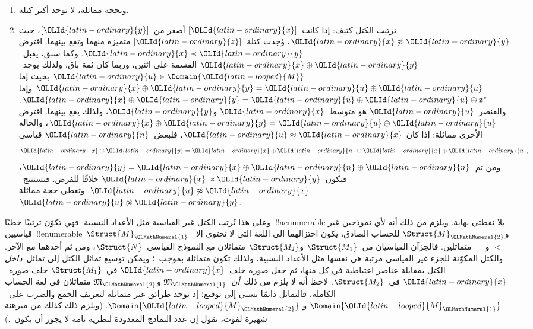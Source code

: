 \documentclass[../../../include/open-logic-section]{subfiles}
\begin{document}
\begin{enumerate}
\item وبحجة مماثلة، لا توجد أكبر كتلة.
\item ترتيب الكتل كثيف: إذا كانت~$[\OLId{latin-ordinary}{x}]$ أصغر من~$[\OLId{latin-ordinary}{y}]$، حيث
  $\OLId{latin-ordinary}{x} \not\approx \OLId{latin-ordinary}{y}$، وُجدت كتلة~$[\OLId{latin-ordinary}{z}]$ متميزة منهما وتقع بينهما. افترض
  $\OLId{latin-ordinary}{x} \prec \OLId{latin-ordinary}{y}$. وكما سبق، يقبل~$\OLId{latin-ordinary}{x} \oplus \OLId{latin-ordinary}{y}$ القسمة على اثنين، وربما
  كان ثمة باق، ولذلك يوجد~$\OLId{latin-ordinary}{u} \in \Domain{\OLId{latin-looped}{M}}$ بحيث إما
  $\OLId{latin-ordinary}{x} \oplus \OLId{latin-ordinary}{y} = \OLId{latin-ordinary}{u} \oplus \OLId{latin-ordinary}{u}$ وإما
  $\OLId{latin-ordinary}{x} \oplus \OLId{latin-ordinary}{y} = \OLId{latin-ordinary}{u} \oplus \OLId{latin-ordinary}{u} \oplus \mathbf{z}^*$. والعنصر~$\OLId{latin-ordinary}{u}$ هو
  متوسط~$\OLId{latin-ordinary}{x}$ و$\OLId{latin-ordinary}{y}$، ولذلك يقع بينهما. افترض
  $\OLId{latin-ordinary}{x} \oplus \OLId{latin-ordinary}{y} = \OLId{latin-ordinary}{u} \oplus \OLId{latin-ordinary}{u}$، والحالة الأخرى مماثلة: إذا كان
  $\OLId{latin-ordinary}{u} \approx \OLId{latin-ordinary}{x}$، فلبعض~$\OLId{latin-ordinary}{n}$ قياسي
  \[
  \OLId{latin-ordinary}{x} \oplus \OLId{latin-ordinary}{y} = \OLId{latin-ordinary}{x} \oplus \OLId{latin-ordinary}{n} \oplus \OLId{latin-ordinary}{x} \oplus \OLId{latin-ordinary}{n},
  \]
  ومن ثم~$\OLId{latin-ordinary}{y} = \OLId{latin-ordinary}{x} \oplus \OLId{latin-ordinary}{n} \oplus \OLId{latin-ordinary}{n}$، فيكون~$\OLId{latin-ordinary}{x} \approx \OLId{latin-ordinary}{y}$ خلافًا
  للفرض. فنستنتج~$\OLId{latin-ordinary}{u} \not\approx \OLId{latin-ordinary}{x}$. وتعطي حجة مماثلة
  $\OLId{latin-ordinary}{u} \not\approx \OLId{latin-ordinary}{y}$.
\end{enumerate}
وعلى هذا تُرتب الكتل غير القياسية مثل الأعداد النسبية: فهي تكوّن ترتيبًا
خطيًا~!!a{enumerable} بلا نقطتي نهاية. ويلزم من ذلك أنه لأي نموذجين
غير قياسيين~!!{enumerable}~$\Struct{M}_\OLMathNumeral{1}$ و$\Struct{M}_\OLMathNumeral{2}$ للحساب
الصادق، يكون اختزالهما إلى اللغة التي لا تحتوي إلا~$<$ و$=$ متماثلين.
فالجزآن القياسيان من~$\Struct{M_1}$ و$\Struct{M_2}$ متماثلان مع
النموذج القياسي~$\Struct{N}$، ومن ثم أحدهما مع الآخر. والكتل المكوّنة
للجزء غير القياسي مرتبة هي نفسها مثل الأعداد النسبية، ولذلك تكون
متماثلة بموجب~؛ ويمكن توسيع تماثل الكتل إلى
تماثل~\emph{داخل} الكتل بمقابلة عناصر اعتباطية في كل منها، ثم جعل
صورة خلف~$\OLId{latin-ordinary}{x}$ في~$\Struct{M_1}$ خلف صورة~$\OLId{latin-ordinary}{x}$ في~$\Struct{M_2}$. لاحظ
أنه لا يلزم من ذلك~\emph{أن}~$\mathfrak{M}_\OLMathNumeral{1}$ و$\mathfrak{M}_\OLMathNumeral{2}$
متماثلان في لغة الحساب الكاملة، فالتماثل دائمًا نسبي إلى توقيع؛ إذ
توجد طرائق غير متماثلة لتعريف الجمع والضرب على~$\Domain{\OLId{latin-looped}{M}_\OLMathNumeral{1}}$ و
$\Domain{\OLId{latin-looped}{M}_\OLMathNumeral{2}}$. (ويلزم ذلك كذلك من مبرهنة شهيرة لفوت، تقول إن عدد
النماذج المعدودة لنظرية تامة لا يجوز أن يكون~.)
\end{document}
